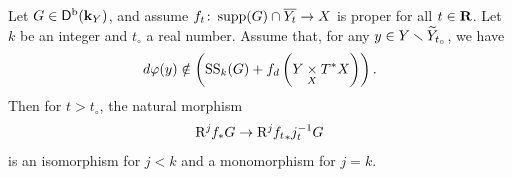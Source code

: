 \begin{Proposition+}\label{prop:rel-t-morse}
  Let \(G\in\Dompb(\kk_Y)\), and assume \(
    f_{t}\colon \supp(G)\cap \overline{Y_t}\to X
  \) is proper for all \(t\in\rr\). 
  Let \(k\) be an integer and \(t_\circ\) a real number.
    Assume that, 
    for any \(y\in Y\smi \widetilde{Y}_{t_{\circ}}\), 
    we have \begin{equation}\label{eq:hyp-morse}
      d\varphi(y)\notin \left(
        \muS[k](G)+ \mdiff[f]\left(
          Y\pb[X]\cotb[X]
        \right)
      \right).
    \end{equation}
    Then 
    for \(t>t_\circ\), the natural morphism
        \[
          \Rder[j]{f_{\ast}}G \to \Rder[j]{{f_{t}}_{\ast}}j^{-1}_{t}G
        \]
        is an isomorphism for \(j<k\) 
        and a monomorphism for \(j=k\).    

\end{Proposition+}
